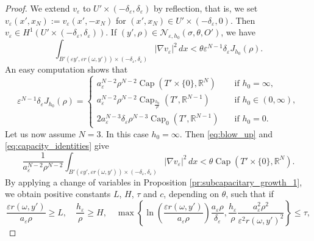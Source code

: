 \documentclass[10pt,a4paper]{amsart}
\newcommand{\cpct}{\operatorname{Cap}}
\begin{document}
\begin{proof}
    We extend $v_\varepsilon$ to $U' \times (-\delta_\varepsilon, \delta_\varepsilon)$ by reflection, that is, we set $v_\varepsilon(x', x_N) := v_\varepsilon(x', -x_N)$ for $(x', x_N) \in U' \times (-\delta_\varepsilon, 0)$. Then $v_\varepsilon \in H^1(U' \times (-\delta_\varepsilon, \delta_\varepsilon))$. If $(y', \rho) \in \mathcal{N}_{\varepsilon, h_0}(\sigma, \theta, O')$, we have
    \begin{equation} \label{eq:blow_up}
        \int_{B'(\varepsilon y', \varepsilon r(\omega, y')) \times (-\delta_\varepsilon, \delta_\varepsilon)} |\nabla v_\varepsilon|^2  \, dx < \theta \varepsilon^{N - 1} \delta_\varepsilon J_{h_0}(\rho).
    \end{equation}
    An easy computation shows that
    \begin{equation} \label{eq:capacity_identities}
    \varepsilon^{N - 1} \delta_\varepsilon J_{h_0}(\rho) = 
        \begin{cases}
            a_\varepsilon^{N - 2} \rho^{N - 2} \cpct(T' \times \{0\}, \mathbb{R}^N) \quad &\text{if } h_0 = \infty, \\
            a_\varepsilon^{N - 2} \rho^{N - 2} \cpct_{\frac{h_0}{\rho}}(T', \mathbb{R}^{N - 1}) \quad &\text{if } h_0 \in (0, \infty), \\
            2 a_\varepsilon^{N - 3} \delta_\varepsilon \rho^{N - 3} \cpct_0(T', \mathbb{R}^{N - 1}) \quad &\text{if } h_0 = 0.
        \end{cases}
    \end{equation}
    Let us now assume $N = 3$. In this case $h_0 = \infty$. Then \eqref{eq:blow_up} and \eqref{eq:capacity_identities} give
    \[
    \frac{1}{a_\varepsilon^{N - 2} \rho^{N - 2}} \int_{B'(\varepsilon y', \varepsilon r(\omega, y')) \times (-\delta_\varepsilon, \delta_\varepsilon)} |\nabla v_\varepsilon|^2 \, dx < \theta \cpct(T' \times \{0\}, \mathbb{R}^N).
    \]
    By applying a change of variables in Proposition \ref{pr:subcapacitary_growth_1}, we obtain positive constants $L$, $H$, $\tau$ and $c$, depending on $\theta$, such that if
    \begin{equation} \label{eq:desired_implication}
         \frac{\varepsilon r(\omega, y')}{a_\varepsilon \rho} \ge L, \quad \frac{h_\varepsilon}{\rho} \ge H, \quad \max \left\{\ln\left(\frac{\varepsilon r(\omega, y')}{a_\varepsilon \rho}\right) \frac{a_\varepsilon \rho}{\delta_\varepsilon}, \frac{h_\varepsilon}{\rho}\frac{a_\varepsilon^2 \rho^2}{\varepsilon^2 r(\omega, y')^2}\right\} \le \tau,

\end{equation}
\end{proof}
\end{document}
